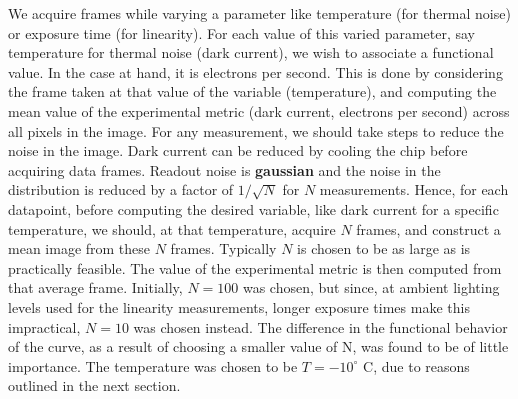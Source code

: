 \documentclass[../main.tex]{subfiles}
\begin{document}
		We acquire frames while varying a parameter like temperature (for thermal noise) or exposure time (for linearity). For each value of this varied parameter, say temperature for thermal noise (dark current), we wish to associate a functional value. In the case at hand, it is electrons per second. This is done by considering the frame taken at that value of the variable (temperature), and computing the mean value of the experimental metric (dark current, electrons per second) across all pixels in the image. For any measurement, we should take steps to reduce the noise in the image. Dark current can be reduced by cooling the chip before acquiring data frames. Readout noise is \textbf{gaussian} and the noise in the distribution is reduced by a factor of $1/\sqrt{N}$ for $N$ measurements. Hence, for each datapoint, before computing the desired variable, like dark current for a specific temperature, we should, at that temperature, acquire $N$ frames, and construct a mean image from these $N$ frames. Typically $N$ is chosen to be as large as is practically feasible. The value of the experimental metric is then computed from that average frame. Initially, $N = 100$ was chosen, but since, at ambient lighting levels used for the linearity measurements, longer exposure times make this impractical, $N=10$ was chosen instead. The difference in the functional behavior of the curve, as a result of choosing a smaller value of N, was found to be of little importance. The temperature was chosen to be $T = -10^\circ$ C, due to reasons outlined in the next section.
	
\end{document}
